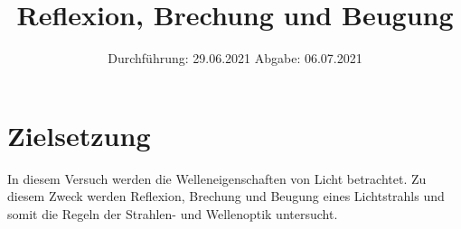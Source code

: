 

\subject{V400}
\title{Reflexion, Brechung und Beugung}
\date{
    Durchführung: 29.06.2021
    \hspace{3em}
    Abgabe: 06.07.2021
}



\maketitle
\thispagestyle{empty}
\tableofcontents
\newpage

\section{Zielsetzung}

    In diesem Versuch werden die Welleneigenschaften von Licht betrachtet.
    Zu diesem Zweck werden
    Reflexion, Brechung und Beugung eines Lichtstrahls
    und somit die Regeln der Strahlen- und Wellenoptik
    untersucht.


\clearpage


\clearpage


\clearpage


\clearpage

\printbibliography


